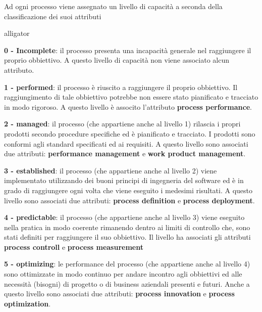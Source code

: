 Ad ogni processo viene assegnato un livello di capacità a seconda della classificazione dei suoi attributi
\begin{labeling}{alligator}
	\item \textbf{0 - Incomplete}: il processo presenta una incapacità generale nel raggiungere il proprio obbiettivo. A questo livello di capacità non viene associato alcun attributo.
	\item \textbf{1 - performed}: il processo è riuscito a raggiungere il proprio obbiettivo. Il raggiungimento di tale obbiettivo potrebbe non essere stato pianificato e tracciato in modo rigoroso. A questo livello è associto l'attributo \textbf{process performance}.
	\item \textbf{2 - managed}: il processo (che appartiene anche al livello 1) rilascia i propri prodotti secondo procedure specifiche ed è pianificato e tracciato. I prodotti sono conformi agli standard specificati ed ai requisiti. A questo livello sono associati due attributi: \textbf{performance management} e \textbf{work product management}.
	\item \textbf{3 - established}: il processo (che appartiene anche al livello 2) viene implementato utilizzando dei buoni principi di ingegneria del software ed è in grado di raggiungere ogni volta che viene eseguito i medesimi risultati. A questo livello sono associati due attributi: \textbf{process definition} e \textbf{process deployment}.
	\item \textbf{4 - predictable}: il processo (che appartiene anche al livello 3) viene eseguito nella pratica in modo coerente rimanendo dentro ai limiti di controllo che, sono stati definiti per raggiungere il suo obbiettivo. Il livello ha associati gli attributi \textbf{process controll} e \textbf{process measurement}
	\item \textbf{5 - optimizing}: le performance del processo (che appartiene anche al livello 4) sono ottimizzate in modo continuo per andare incontro agli obbiettivi ed alle necessità (bisogni) di progetto o di business aziendali presenti e futuri. %
	Anche a questo livello sono associati due attributi: \textbf{process innovation} e \textbf{process optimization}.
\end{labeling}

